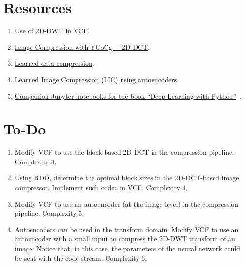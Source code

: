\section*{Resources}

\begin{enumerate}
\item Use of \href{https://github.com/Sistemas-Multimedia/VCF/blob/main/src/DWT.py}{2D-DWT in VCF}.
\item
  \href{https://github.com/vicente-gonzalez-ruiz/DCT2D/blob/master/src/DCT2D/YCoCg_2D_DCT_SQ.ipynb}{Image
    Compression with YCoCg + 2D-DCT}.
\item
  \href{https://www.tensorflow.org/tutorials/generative/data_compression}{Learned
    data compression}.
\item
  \href{https://github.com/vicente-gonzalez-ruiz/learned_image_compression/blob/main/LIC.ipynb}{Learned
    Image Compression (LIC) using autoencoders}.
\item
  \href{https://github.com/fchollet/deep-learning-with-python-notebooks}{Companion
    Jupyter notebooks for the book ``Deep Learning with
    Python''}~\cite{chollet2021deep}.
\end{enumerate}


\section{To-Do}

\begin{enumerate}
\item Modify VCF to use the block-based 2D-DCT in the compression pipeline. Complexity 3.
\item Using RDO, determine the optimal block sizes in the 2D-DCT-based
  image compressor. Implement such codec in VCF. Complexity 4.
\item Modify VCF to use an autoencoder (at the image level) in the
  compression pipeline. Complexity 5.
\item Autoencoders can be used in the transform domain. Modify VCF to
  use an autoencoder with a small input to compress the 2D-DWT
  transform of an image. Notice that, in this case, the parameters of
  the neural network could be sent with the code-stream. Complexity 6.
\end{enumerate}

